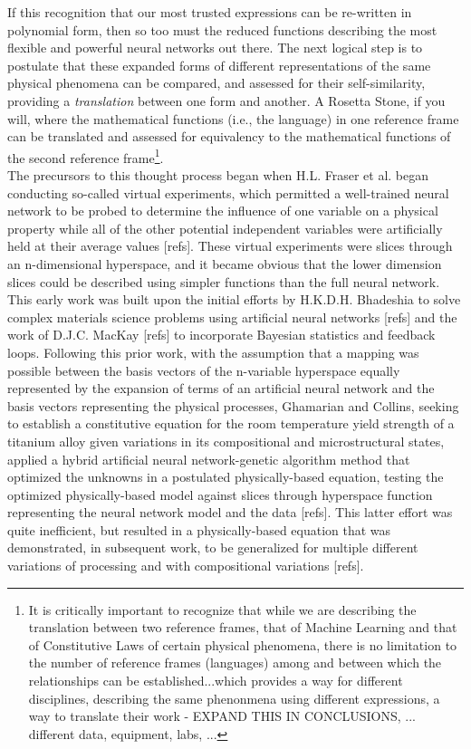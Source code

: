 If this recognition that our most trusted expressions can be re-written in polynomial form, then so too must the reduced functions describing the most flexible and powerful neural networks out there.  The next logical step is to postulate that these expanded forms of different representations of the same physical phenomena can be compared, and assessed for their self-similarity, providing a \textit{translation} between one form and another.  A Rosetta Stone, if you will, where the mathematical functions (i.e., the language) in one reference frame can be translated and assessed for equivalency to the mathematical functions of the second reference frame\footnote{It is critically important to recognize that while we are describing the translation between two reference frames, that of Machine Learning and that of Constitutive Laws of certain physical phenomena, there is no limitation to the number of reference frames (languages) among and between which the relationships can be established...which provides a way for different disciplines, describing the same phenonmena using different expressions, a way to translate their work - EXPAND THIS IN CONCLUSIONS, ... different data, equipment, labs, ...}.\\

The precursors to this thought process began when H.L. Fraser et al. began conducting so-called virtual experiments, which permitted a well-trained neural network to be probed to determine the influence of one variable on a physical property while all of the other potential independent variables were artificially held at their average values [refs]. These virtual experiments were slices through an n-dimensional hyperspace, and it became obvious that the lower dimension slices could be described using simpler functions than the full neural network.  This early work was built upon the initial efforts by H.K.D.H. Bhadeshia to solve complex materials science problems using artificial neural networks [refs] and the work of D.J.C. MacKay [refs] to incorporate Bayesian statistics and feedback loops.  Following this prior work, with the assumption that a mapping was possible between the basis vectors of the n-variable hyperspace equally represented by the expansion of terms of an artificial neural network and the basis vectors representing the physical processes, Ghamarian and Collins, seeking to establish a constitutive equation for the room temperature yield strength of a titanium alloy given variations in its compositional and microstructural states, applied a hybrid artificial neural network-genetic algorithm method that optimized the unknowns in a postulated physically-based equation, testing the optimized physically-based model against slices through hyperspace function representing the neural network model and the data [refs]. This latter effort was quite inefficient, but resulted in a physically-based equation that was demonstrated, in subsequent work, to be generalized for multiple different variations of processing and with compositional variations [refs].   \\

